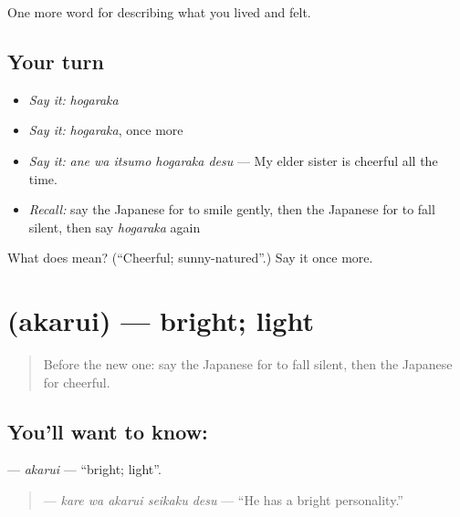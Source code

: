 \begin{grammarlens}[title={What you've built}]
One more word for describing what you lived and felt.
\end{grammarlens}

\subsection*{Your turn}
\begin{itemize}
\raggedright
  \item \emph{Say it:} \emph{hogaraka}
  \item \emph{Say it:} \emph{hogaraka}, once more
  \item \emph{Say it:} \emph{ane wa itsumo hogaraka desu} — My elder sister is cheerful all the time.
  \item \emph{Recall:} say the Japanese for to smile gently, then the Japanese for to fall silent, then say \emph{hogaraka} again
\end{itemize}

\begin{tcolorbox}[breakable,colback=teal!4,colframe=teal!35!black,title={Before you move on}]
What does  mean? (\textquotedblleft{}Cheerful; sunny-natured\textquotedblright{}.) Say it once more.
\end{tcolorbox}
\section[\texorpdfstring{\ja{あかるい} (akarui)}{あかるい (akarui)}]{ (akarui) — bright; light}

\label{lesson:JA-C436-akarui}



\begin{quote}
Before the new one: say the Japanese for to fall silent, then the Japanese for cheerful.
\end{quote}

\subsection*{You'll want to know: }
\textbf{} — \emph{akarui} — \textquotedblleft{}bright; light\textquotedblright{}.

\begin{quote}
\textbf{  } — \emph{kare wa akarui seikaku desu} — \textquotedblleft{}He has a bright personality.\textquotedblright{}
\end{quote}

